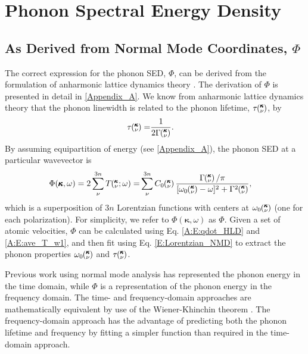 \documentclass[12pt,twocolumn,iop]{/usr/share/texmf-texlive/tex/latex/iop/iopart}[/usr/share/texmf-texlive/tex/latex/iop/]
\newcommand{\kvw}{\mspace{-4.0mu}\left(\mspace{-8.0mu}\begin{smallmatrix}&\pmb{\kappa} \\&\nu\end{smallmatrix}\mspace{-2.0mu};\omega\right)}
\newcommand{\kv}{\mspace{-4.0mu}\left(\mspace{-8.0mu}\begin{smallmatrix}&\pmb{\kappa} \\&\nu\end{smallmatrix}\mspace{-3.0mu}\right)}
\begin{document}
\section{\label{S:Section_NMD}Phonon Spectral Energy Density}

\subsection{\label{S:Subsection_NMD}As Derived from Normal Mode Coordinates, $\Phi$}

The correct expression for the phonon SED, $\Phi$, can be derived from the formulation of anharmonic lattice dynamics theory \cite{maradudin1974,wallace1972,dove1993,srivastava1990}. The derivation of $\Phi$ is presented in detail in \ref{Appendix_A}. We know from anharmonic lattice dynamics theory that the phonon linewidth is related to the phonon lifetime, $\tau\kv$, by\cite{maradudin1962,ladd1986}
\begin{equation}\label{E:lifetime}
\begin{split}
\tau\kv=&\frac{1}{2\Gamma\kv}.
\end{split}
\end{equation}
By assuming equipartition of energy (see \ref{Appendix_A}), the phonon SED at a particular wavevector is
\begin{equation}\label{E:Lorentzian_NMD}
\begin{split}
\Phi(\pmb{\kappa},\omega) = 2\sum_{\nu}^{3n} T\kvw =& \sum_{\nu}^{3n}C_0\kv\frac{\Gamma\kv/\pi}{[\omega_0\kv-\omega]^2+\Gamma^2\kv},
\end{split}
\end{equation}
which is a superposition of $3n$ Lorentzian functions with centers at $\omega_0\kv$ (one for each polarization). For simplicity, we refer to $\Phi(\pmb{\kappa},\omega)$ as $\Phi$. Given a set of atomic velocities, $\Phi$ can be calculated using Eq$.$ \eqref{A:E:qdot_HLD} and \eqref{A:E:ave_T_w1}, and then fit using Eq$.$ \eqref{E:Lorentzian_NMD} to extract the phonon properties $\omega_0\kv$ and $\tau\kv$.

Previous work using normal mode analysis has represented the phonon energy in the time domain,\cite{ladd1986,mcgaughey2004c,henry2008,turney2009a,goicochea2010,He2011} while $\Phi$ is a representation of the phonon energy in the frequency domain. The time- and frequency-domain approaches are mathematically equivalent by use of the Wiener-Khinchin theorem \cite{rudin1987,shiomi2011b}. The frequency-domain approach has the advantage of predicting both the phonon lifetime and frequency by fitting a simpler function than required in the time-domain approach.
\end{document}
